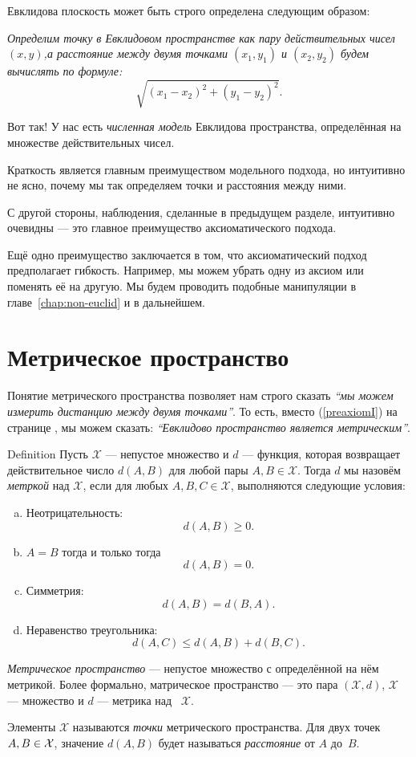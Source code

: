 Евклидова плоскость может быть строго определена следующим образом:

{}\emph{Определим {}\emph{точку} в Евклидовом пространстве как пару действительных чисел $(x,y)$,а {}\emph{расстояние} между двумя точками $(x_1,y_1)$ и $(x_2,y_2)$ будем вычислять по формуле:}
\[\sqrt{(x_1-x_2)^2+(y_1-y_2)^2}.\]

Вот так!
У нас есть {}\emph{численная модель} Евклидова пространства,
определённая на множестве действительных чисел.

Краткость является главным преимуществом модельного подхода,
но интуитивно не ясно, почему мы так определяем точки и расстояния между ними.

С другой стороны, наблюдения, сделанные в предыдущем разделе, интуитивно очевидны ---
это главное преимущество аксиоматического подхода.

Ещё одно преимущество заключается в том, что аксиоматический подход предполагает гибкость.
Например, мы можем убрать одну из аксиом
или поменять её на другую.
Мы будем проводить подобные манипуляции в главе~\ref{chap:non-euclid} и в дальнейшем.

\section*{Метрическое пространство}

Понятие метрического пространства позволяет нам
строго сказать {}\emph{``мы можем измерить дистанцию между двумя точками''}.
То есть, вместо (\ref{preaxiomI}) на странице \pageref{preaxiomI},
мы можем сказать: {}\emph{``Евклидово пространство является метрическим''}.

\begin{thm}{Definition}\label{def:metric-space}
Пусть $\mathcal X$ — непустое множество и 
$d$ — функция,
которая возвращает действительное число $d(A,B)$
для любой пары $A,B\in\mathcal X$.
Тогда $d$
мы назовём \emph{метркой} над 
$\mathcal X$, если для любых
$A,B,C\in \mathcal X$, выполняются следующие условия:
\begin{enumerate}[(a)]
\item\label{def:metric-space:a} Неотрицательность: 
$$d(A,B)\ge 0.$$
\item\label{def:metric-space:b} $A=B$ тогда и только тогда
$$d(A,B)=0.$$
\item\label{def:metric-space:c} Симметрия: $$d(A, B) = d(B, A).$$
\item\label{def:metric-space:d} Неравенство треугольника: 
$$d(A, C) \le d(A, B) + d(B, C).$$
\end{enumerate}
\emph{Метрическое пространство} — непустое множество с определённой на нём метрикой. 
Более формально, матрическое пространство — это пара $(\mathcal X, d)$, $\mathcal X$ — множество и $d$ — метрика над ~$\mathcal X$.

Элементы $\mathcal X$ называются \emph{точки} метрического пространства.
Для двух точек $A,B\z\in \mathcal X$, 
значение $d(A, B)$ будет называться \emph{расстояние} от $A$ до~$B$.
\end{thm}

